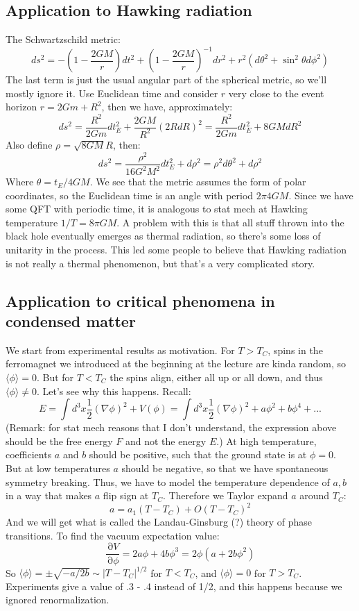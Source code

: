 \documentclass[12 pt]{article}
\DeclareMathOperator {\p} {\partial}
\begin{document}
\subsection*{Application to Hawking radiation}
The Schwartzschild metric:
\[       ds^2 = - \left( 1 - \frac{2GM}{r} \right) dt^2 +  \left( 1 - \frac{2GM}{r} \right)^{-1} dr^2  +  r^2 (d\theta^2 + \sin^2 \theta d\phi^2 )          \]
The last term is just the usual angular part of the spherical metric, so we'll mostly ignore it. Use Euclidean time and consider $r$ very close to the event horizon $r = 2Gm + R^2$, then we have, approximately:
\[      ds^2 = \frac{R^2}{2Gm} dt_E^2 + \frac{2GM}{R^2} (2RdR)^2 =  \frac{R^2}{2Gm} dt_E^2 + 8GM dR^2    \]
Also define $\rho = \sqrt{8GM} R$, then:
\[        ds^2 = \frac{\rho^2}{16 G^2 M^2} dt_E^2 + d\rho^2   = \rho^2 d\theta^2 + d\rho^2   \]
Where $\theta = t_E / 4GM$. We see that the metric assumes the form of polar coordinates, so the Euclidean time is an angle with period $2\pi 4GM$. Since we have some QFT with periodic time, it is analogous to stat mech at Hawking temperature $1/T = 8\pi GM$. A problem with this is that all stuff thrown into the black hole eventually emerges as thermal radiation, so there's some loss of unitarity in the process. This led some people to believe that Hawking radiation is not really a thermal phenomenon, but that's a very complicated story.

\subsection*{Application to critical phenomena in condensed matter}
We start from experimental results as motivation. For $T>T_C$, spins in the ferromagnet we introduced at the beginning at the lecture are kinda random, so $\langle \phi \rangle = 0$. But for $T<T_C$ the spins align, either all up or all down, and thus $\langle \phi \rangle \neq 0$. Let's see why this happens. Recall:
\[     E = \int d^3 x \frac{1}{2} (\nabla \phi)^2 + V(\phi)  =  \int d^3 x \frac{1}{2} (\nabla \phi)^2 + a \phi^2 + b \phi^4 + ...  \]
(Remark: for stat mech reasons that I don't understand, the expression above should be the free energy $F$ and not the energy $E$.) At high temperature, coefficients $a$ and $b$ should be positive, such that the ground state is at $\phi=0$. But at low temperatures $a$ should be negative, so that we have spontaneous symmetry breaking. Thus, we have to model the temperature dependence of $a, b$ in a way that makes $a$ flip sign at $T_C$. Therefore we Taylor expand $a$ around $T_C$:
\[ a = a_1 (T - T_C) + O(T-T_C)^2  \]
 And we will get what is called the Landau-Ginsburg (?) theory of phase transitions. To find the vacuum expectation value:
\[     \frac{\p V}{\p \phi} = 2a\phi + 4b\phi^3 = 2\phi (a + 2b \phi^2)   \]
So $\langle \phi \rangle = \pm \sqrt{-a/2b} \sim |T-T_C|^{1/2} $ for $T<T_C$, and $\langle \phi \rangle = 0$ for $T>T_C$. Experiments give a value of .3 - .4 instead of 1/2, and this happens because we ignored renormalization.
\end{document}
